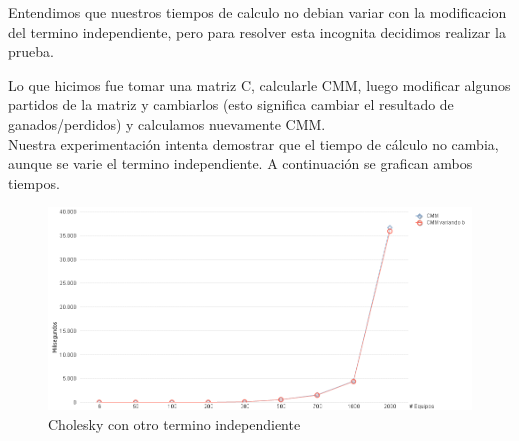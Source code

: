 Entendimos que nuestros tiempos de calculo no debian variar con la modificacion del termino independiente, pero para resolver esta incognita decidimos realizar la prueba.

Lo que hicimos fue tomar una matriz C, calcularle CMM, luego modificar algunos partidos de la matriz y cambiarlos (esto significa cambiar el resultado de ganados/perdidos) y calculamos nuevamente CMM. \\

Nuestra experimentación intenta demostrar que el tiempo de cálculo no cambia, aunque se varie el termino independiente.
A continuación se grafican ambos tiempos.\\

\begin{figure}[H]
\centering
\includegraphics[width=1\textwidth]{IMG/Cholesky con otro termino independiente.png}
\caption{Cholesky con otro termino independiente}
\label{fig:Cholesky con otro termino independiente}
\end{figure}
